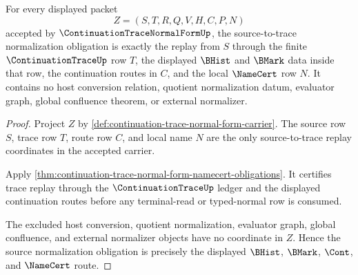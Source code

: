 \begin{theorem}
\label{thm:continuation-trace-normal-form-source-normalization-obligation}
For every displayed packet
$$
Z=(S,T,R,Q,V,H,C,P,N)
$$
accepted by $\ContinuationTraceNormalFormUp$, the source-to-trace normalization obligation is exactly the replay from $S$ through the finite $\ContinuationTraceUp$ row $T$, the displayed $\BHist$ and $\BMark$ data inside that row, the continuation routes in $C$, and the local $\NameCert$ row $N$. It contains no host conversion relation, quotient normalization datum, evaluator graph, global confluence theorem, or external normalizer.
\end{theorem}
\begin{proof}
Project $Z$ by \autoref{def:continuation-trace-normal-form-carrier}. The source row $S$, trace row $T$, route row $C$, and local name $N$ are the only source-to-trace replay coordinates in the accepted carrier.

Apply \autoref{thm:continuation-trace-normal-form-namecert-obligations}. It certifies trace replay through the $\ContinuationTraceUp$ ledger and the displayed continuation routes before any terminal-read or typed-normal row is consumed.

The excluded host conversion, quotient normalization, evaluator graph, global confluence, and external normalizer objects have no coordinate in $Z$. Hence the source normalization obligation is precisely the displayed $\BHist$, $\BMark$, $\Cont$, and $\NameCert$ route.
\end{proof}

